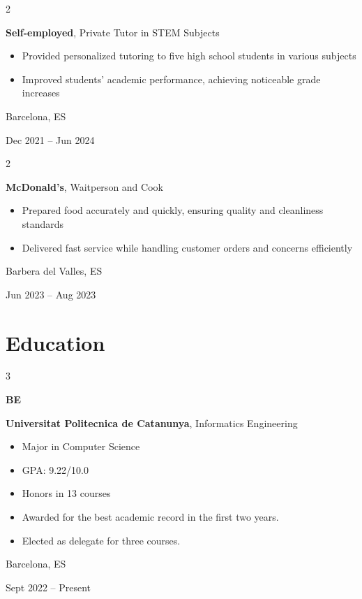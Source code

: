 \documentclass[10pt, letterpaper]{article}
\newenvironment{highlights}{
    \begin{itemize}[
        topsep=0.10 cm,
        parsep=0.10 cm,
        partopsep=0pt,
        itemsep=0pt,
        leftmargin=0.4 cm + 10pt
    ]
}{
    \end{itemize}
} %
\newenvironment{twocolentry}[2][]{
    \onecolentry
    \def\secondColumn{#2}
    \setcolumnwidth{\fill, 4.5 cm}
    \begin{paracol}{2}
}{
    \switchcolumn \raggedleft \secondColumn
    \end{paracol}
    \endonecolentry
} %
\newenvironment{threecolentry}[3][]{
    \onecolentry
    \def\thirdColumn{#3}
    \setcolumnwidth{1 cm, \fill, 4.5 cm}
    \begin{paracol}{3}
    {\raggedright #2} \switchcolumn
}{
    \switchcolumn \raggedleft \thirdColumn
    \end{paracol}
    \endonecolentry
} %
\begin{document}
        \vspace{0.2 cm}

        \begin{twocolentry}{
            Barcelona, ES

            Dec 2021 – Jun 2024
        }
            \textbf{Self-employed}, Private Tutor in STEM Subjects
            \begin{highlights}
                \item Provided personalized tutoring to five high school students in various subjects
                \item Improved students' academic performance, achieving noticeable grade increases
            \end{highlights}
        \end{twocolentry}

        \vspace{0.2 cm}

        \begin{twocolentry}{
            Barbera del Valles, ES
            
            Jun 2023 – Aug 2023
        }
            \textbf{McDonald's}, Waitperson and Cook
            \begin{highlights}
                \item Prepared food accurately and quickly, ensuring quality and cleanliness standards
                \item Delivered fast service while handling customer orders and concerns efficiently
            \end{highlights}
        \end{twocolentry}


    \section{Education}
        \begin{threecolentry}{\textbf{BE}}{
            Barcelona, ES
            
            Sept 2022 – Present
        }
            \textbf{Universitat Politecnica de Catanunya}, Informatics Engineering
            \begin{highlights}
                \item Major in Computer Science
                \item GPA: 9.22/10.0
                \item Honors in 13 courses
                \item Awarded for the best academic record  in the first two years.
                \item Elected as delegate for three courses.
            \end{highlights}
        \end{threecolentry}
\end{document}
